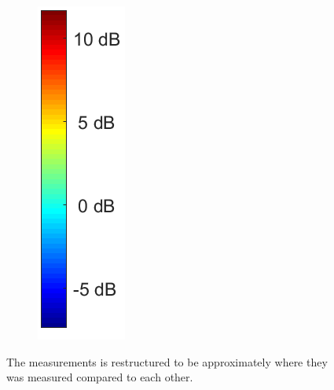 \begin{figure}[H]
\begin{subfigure}[b]{0.1\textwidth}
\includegraphics[width=\textwidth]{figures/Not_Norm_space_colorbar.png}
\end{subfigure}
\captionsetup{belowskip=-1.5em}
\caption{The measurements is restructured to be approximately where they was measured compared to each other.}
\label{fig:Not_norm_space}
\end{figure}

